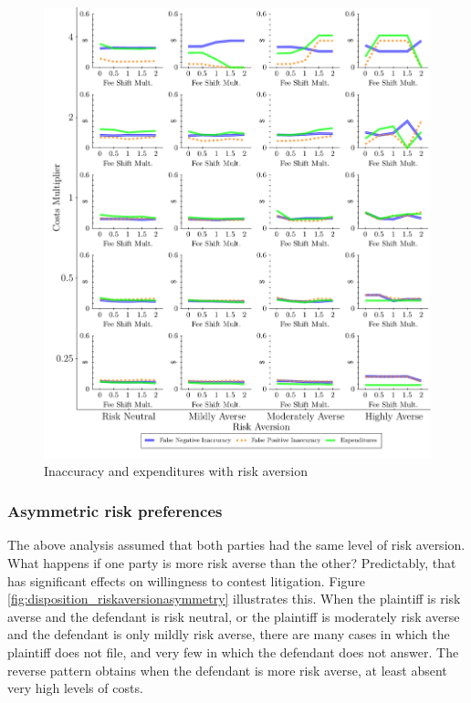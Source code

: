 \documentclass{article}
\begin{document}
\begin{figure}[h!]
\centering
\includegraphics[scale=0.50, trim={0in 0in 0in 0in}, clip]{../Figures/Accuracy and Expenditures Varying Risk Aversion.pdf}
\caption{Inaccuracy and expenditures with risk aversion}
\label{fig:accexp_riskaversion}
\end{figure}

\subsubsection{Asymmetric risk preferences}

The above analysis assumed that both parties had the same level of risk aversion. What happens if one party is more risk averse than the other? Predictably, that has significant effects on willingness to contest litigation. Figure \ref{fig:disposition_riskaversionasymmetry} illustrates this. When the plaintiff is risk averse and the defendant is risk neutral, or the plaintiff is moderately risk averse and the defendant is only mildly risk averse, there are many cases in which the plaintiff does not file, and very few in which the defendant does not answer. The reverse pattern obtains when the defendant is more risk averse, at least absent very high levels of costs.
\end{document}
